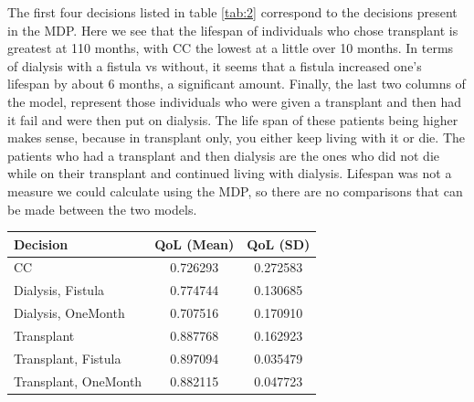 \documentclass[10pt,twocolumn]{article}
\begin{document}
The first four decisions listed in table \ref{tab:2} correspond to the decisions present in the MDP. Here we see that the lifespan of individuals who chose transplant is greatest at 110 months, with CC the lowest at a little over 10 months. In terms of dialysis with a fistula vs without, it seems that a fistula increased one's lifespan by about 6 months, a significant amount. Finally, the last two columns of the model, represent those individuals who were given a transplant and then had it fail and were then put on dialysis. The life span of these patients being higher makes sense, because in transplant only, you either keep living with it or die. The patients who had a transplant and then dialysis are the ones who did not die while on their transplant and continued living with dialysis. Lifespan was not a measure we could calculate using the MDP, so there are no comparisons that can be made between the two models.


\begin{center}
  \begin{tabularx}{\columnwidth}{X c c} 
  \toprule
  \textbf{Decision} & \textbf{QoL (Mean)} & \textbf{QoL (SD)} \\
  \midrule
 CC & 0.726293 & 0.272583 \\
 Dialysis, Fistula & 0.774744 & 0.130685 \\
 Dialysis, OneMonth & 0.707516 & 0.170910 \\
 Transplant & 0.887768 & 0.162923 \\
 Transplant, Fistula & 0.897094 & 0.035479 \\
 Transplant, OneMonth & 0.882115 & 0.047723 \\
  \bottomrule
  \end{tabularx}
  \label{tab:1}
\end{center}
\end{document}
